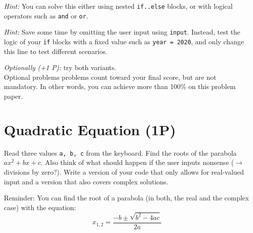 \documentclass[
	english,
	fontsize=10pt,
	parskip=half,
	titlepage=true,
	DIV=12
]{scrartcl}
\newcommand*{\inPy}[1]{\texttt{#1}}
\begin{document}
\emph{Hint:} You can solve this either using nested \inPy{if..else} blocks, or with logical operators such as \inPy{and} or \inPy{or}.

\emph{Hint:} Save some time by omitting the user input using \inPy{input}. Instead, test the logic of your \inPy{if} blocks with a fixed value such as 
\inPy{year = 2020}, and only change this line to test different scenarios.

\emph{Optionally (+1 P):} try both variants.\\
Optional problems problems count toward your final score, but are not mandatory. In other words, you can achieve more than 100\% on this problem paper.

\section{Quadratic Equation (1\;P)}
Read three values \inPy{a, b, c} from the keyboard. Find the roots of the parabola $ax^2 + bx +c$. Also think of what should happen if the user inputs nonsense ($\rightarrow$ divisions by zero?). Write a version of your code that only allows for real-valued input and a version that also covers complex solutions.

Reminder: You can find the root of a parabola (in both, the real and the complex case) with the equation:
\[ x_{1,2} = \frac{-b \pm \sqrt{b^2 - 4ac}}{2a} \]
\end{document}
